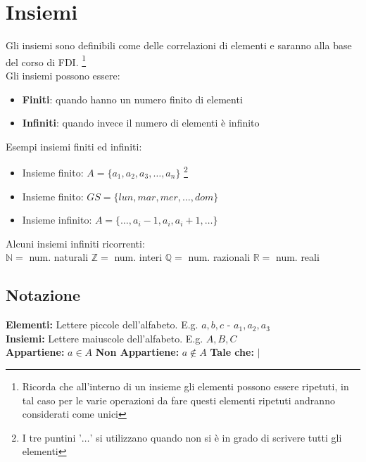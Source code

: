 \section{Insiemi}
Gli insiemi sono definibili come delle correlazioni di elementi e saranno alla base del corso di FDI. \footnote{Ricorda che all'interno di un insieme gli elementi possono essere ripetuti, in tal caso per le varie operazioni da fare questi elementi ripetuti andranno considerati come unici} \\
Gli insiemi possono essere:
\begin{itemize}
	\item \textbf{Finiti}: quando hanno un numero finito di elementi
	\item \textbf{Infiniti}: quando invece il numero di elementi è infinito
\end{itemize}
\begin{example}
Esempi insiemi finiti ed infiniti:
	\begin{itemize}
	    \item Insieme finito: $A = \{a_1, a_2, a_3, \ldots, a_n \}$
	    \footnote{I tre puntini '$\ldots$' si utilizzano quando non si è in grado di scrivere tutti gli elementi}
	    \item Insieme finito: $GS = \{lun, mar, mer, \ldots, dom\}$
	    \item Insieme infinito: $A = \{\ldots, a_i-1, a_i, a_i+1, \ldots\}$
	\end{itemize}
\end{example}
\begin{example}
	Alcuni insiemi infiniti ricorrenti:\\
	$\mathbb{N} =$ num. naturali
	\hspace{.5cm}
	$\mathbb{Z} =$ num. interi
	\hspace{.5cm}
	$\mathbb{Q} =$ num. razionali
	\hspace{.5cm}
	$\mathbb{R} =$ num. reali
\end{example}

\subsection{Notazione}
\textbf{Elementi:} Lettere piccole dell'alfabeto. E.g. $a, b, c$ - $a_1, a_2, a_3$ \\
\textbf{Insiemi:} Lettere maiuscole dell'alfabeto. E.g. $A, B, C$ \\
\textbf{Appartiene:} $a \in A$ \hspace { 1cm } \textbf{Non Appartiene:} $a \notin A$ \hspace { 1cm } \textbf{Tale che:} $\mid$ 


